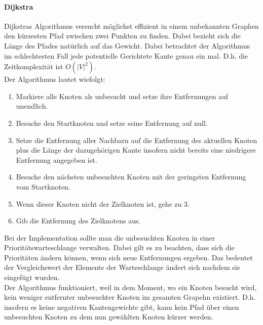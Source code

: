 \documentclass{article}
\begin{document}
\paragraph{Dijkstra}
Dijkstras Algorithmus versucht möglichst effizient in einem unbekannten Graphen den kürzesten Pfad zwischen zwei Punkten zu finden. Dabei bezieht sich die Länge des Pfades natürlich auf das Gewicht. Dabei betrachtet der Algorithmus im schlechtesten Fall jede potentielle Gerichtete Kante genau ein mal. D.h. die Zeitkomplexität ist $O(|V|^2)$.\\
Der Algorithmus lautet wiefolgt:
\begin{enumerate}
    \item Markiere alle Knoten als unbesucht und setze ihre Entfernungen auf unendlich.
    \item Besuche den Startknoten und setze seine Entfernung auf null.
    \item Setze die Entfernung aller Nachbarn auf die Entfernung des aktuellen Knoten plus die Länge der dazugehörigen Kante insofern nicht bereits eine niedrigere Entfernung angegeben ist.
    \item Besuche den nächsten unbesuchten Knoten mit der geringsten Entfernung vom Startknoten.
    \item Wenn dieser Knoten nicht der Zielknoten ist, gehe zu 3.
    \item Gib die Entfernung des Zielknotens aus.
\end{enumerate}
Bei der Implementation sollte man die unbesuchten Knoten in einer Prioritätswarteschlange verwalten. Dabei gilt es zu beachten, dass sich die Prioritäten ändern können, wenn sich neue Entfernungen ergeben. Das bedeutet der Vergleichswert der Elemente der Warteschlange ändert sich nachdem sie eingefügt wurden.\\
Der Algorithmus funktioniert, weil in dem Moment, wo ein Knoten besucht wird, kein weniger entfernter unbesuchter Knoten im gesamten Grapehn existiert. D.h. insofern es keine negativen Kantengewichte gibt, kann kein Pfad über einen unbesuchten Knoten zu dem nun gewählten Knoten kürzer werden.
\end{document}
